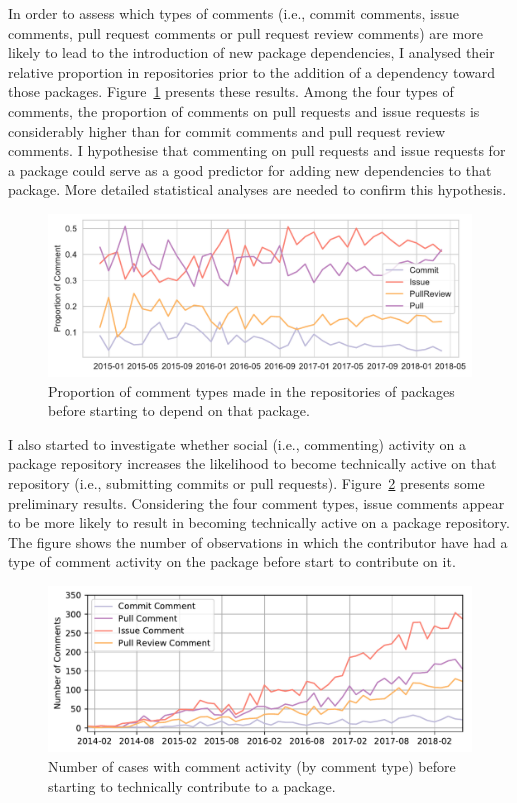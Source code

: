 In order to assess which types of comments (i.e., commit comments, issue comments, pull request comments or pull request review comments) are more likely to lead to the introduction of new package dependencies, I analysed their relative proportion in repositories prior to the addition of a dependency toward those packages. Figure~\ref{fig:fig2} presents these results. 
Among the four types of comments, the proportion of comments on pull requests and issue requests is considerably higher than for commit comments and pull request review comments. I hypothesise that commenting on pull requests and issue requests for a package could serve as a good predictor for adding new dependencies to that package. More detailed statistical analyses are needed to confirm this hypothesis.

\begin{figure}[htb]
\vspace{-0.3cm}
    \includegraphics[width=0.9\columnwidth]{Photos/RQ22.pdf} 
\vspace{-0.3cm}
    \caption{Proportion of comment types made in the repositories of packages before starting to depend on that package.}
    \label{fig:fig2}
\end{figure}

I also started to investigate whether social (i.e., commenting) activity on a package repository increases the likelihood to become technically active on that repository (i.e., submitting commits or pull requests). 
Figure~\ref{fig:fig3} presents some preliminary results. Considering the four comment types, issue comments appear to be more likely to result in becoming technically active on a package repository.
The figure shows the number of observations in which the contributor have had a type of comment activity on the package before start to contribute on it.

\begin{figure}[thb]
\vspace{-0.3cm}
    \includegraphics[width=0.9\columnwidth]{Photos/RQ3.pdf} 
\vspace{-0.3cm}
    \caption{Number of cases with comment activity (by comment type) before starting  to technically contribute to a package.}
    \label{fig:fig3}
\end{figure}


